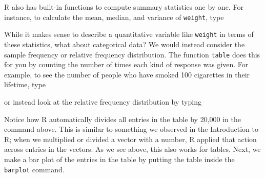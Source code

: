 \documentclass[]{book}
\newenvironment{Shaded}{\begin{snugshade}}{\end{snugshade}}
\newcommand{\KeywordTok}[1]{\textcolor[rgb]{0.13,0.29,0.53}{\textbf{#1}}}
\newcommand{\DecValTok}[1]{\textcolor[rgb]{0.00,0.00,0.81}{#1}}
\newcommand{\OperatorTok}[1]{\textcolor[rgb]{0.81,0.36,0.00}{\textbf{#1}}}
\newcommand{\NormalTok}[1]{#1}
\theoremstyle{definition}
\theoremstyle{definition}
\theoremstyle{definition}
\theoremstyle{remark}
\begin{document}
R also has built-in functions to compute summary statistics one by one.
For instance, to calculate the mean, median, and variance of
\texttt{weight}, type

\begin{Shaded}
\end{Shaded}

While it makes sense to describe a quantitative variable like
\texttt{weight} in terms of these statistics, what about categorical
data? We would instead consider the sample frequency or relative
frequency distribution. The function \texttt{table} does this for you by
counting the number of times each kind of response was given. For
example, to see the number of people who have smoked 100 cigarettes in
their lifetime, type

\begin{Shaded}
\end{Shaded}

or instead look at the relative frequency distribution by typing

\begin{Shaded}
\end{Shaded}

Notice how R automatically divides all entries in the table by 20,000 in
the command above. This is similar to something we observed in the
Introduction to R; when we multiplied or divided a vector with a number,
R applied that action across entries in the vectors. As we see above,
this also works for tables. Next, we make a bar plot of the entries in
the table by putting the table inside the \texttt{barplot} command.

\begin{Shaded}
\end{Shaded}
\end{document}
